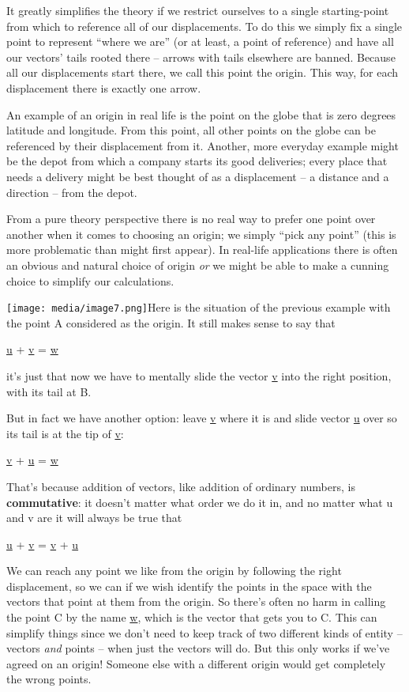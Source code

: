 \documentclass[oneside,english]{amsbook}
\numberwithin{section}{chapter}
\theoremstyle{plain}
\theoremstyle{definition}
\begin{document}
It greatly simplifies the theory if we restrict ourselves to a single
starting-point from which to reference all of our displacements. To do
this we simply fix a single point to represent ``where we are'' (or at
least, a point of reference) and have all our vectors' tails rooted
there -- arrows with tails elsewhere are banned. Because all our
displacements start there, we call this point the origin. This way, for
each displacement there is exactly one arrow.

An example of an origin in real life is the point on the globe that is
zero degrees latitude and longitude. From this point, all other points
on the globe can be referenced by their displacement from it. Another,
more everyday example might be the depot from which a company starts its
good deliveries; every place that needs a delivery might be best thought
of as a displacement -- a distance and a direction -- from the depot.

From a pure theory perspective there is no real way to prefer one point
over another when it comes to choosing an origin; we simply ``pick any
point'' (this is more problematic than might first appear). In real-life
applications there is often an obvious and natural choice of origin
\emph{or} we might be able to make a cunning choice to simplify our
calculations.

\texttt{[image: media/image7.png]}Here is
the situation of the previous example with the point A considered as the
origin. It still makes sense to say that

\ul{u} + \ul{v} = \ul{w}

it's just that now we have to mentally slide the vector \ul{v} into the
right position, with its tail at B.

But in fact we have another option: leave \ul{v} where it is and slide
vector \ul{u} over so its tail is at the tip of \ul{v}:

\ul{v} + \ul{u} = \ul{w}

That's because addition of vectors, like addition of ordinary numbers,
is \textbf{commutative}: it doesn't matter what order we do it in, and
no matter what u and v are it will always be true that

\ul{u} + \ul{v} = \ul{v} + \ul{u}

We can reach any point we like from the origin by following the right
displacement, so we can if we wish identify the points in the space with
the vectors that point at them from the origin. So there's often no harm
in calling the point C by the name \ul{w}, which is the vector that gets
you to C. This can simplify things since we don't need to keep track of
two different kinds of entity -- vectors \emph{and} points -- when just
the vectors will do. But this only works if we've agreed on an origin!
Someone else with a different origin would get completely the wrong
points.
\end{document}
